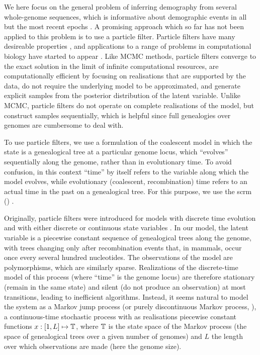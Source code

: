 We here focus on the general problem of inferring demography from several
whole-genome sequences,
which is informative about demographic events in all but the most recent epochs \cite{Schiffels2014b,Li2011a}.
A promising approach which so far has not been applied to this
problem is to use a particle filter.  Particle filters have many
desireable
properties \cite{Arulampalam2002,Doucet2000,Gordon1993},
and applications to a range of problems in computational biology have started to appear
\cite{L2020,M2018,RA2017,Taylor2014}.
Like MCMC methods, particle filters converge to the exact solution in
the limit of infinite computational resources, are computationally efficient by focusing on realisations that are 
supported by the data, do not require the underlying model to be
approximated, and generate explicit samples from the posterior distribution of the latent variable.
Unlike MCMC, particle filters do not operate on complete realisations
of the model, but construct samples sequentially, which is helpful
since full genealogies over genomes are cumbersome to deal with.

To use particle filters, we use a formulation of the coalescent model
in which the state is a genealogical tree at a particular genome
locus, which ``evolves'' sequentially along the genome, rather than in evolutionary
time.  To avoid confusion, in this context ``time'' by itself refers to
the variable along which the model evolves, while evolutionary
(coalescent, recombination) time refers to an actual time in the past
on a genealogical tree. For this purpose, we use the \gls{scrm} () \cite{Staab2015}.

Originally, particle filters were introduced for models with discrete time evolution
and with either discrete or continuous state variables
\cite{Rosenbluth2004,Gordon1993}.
In our model, the latent variable is a piecewise constant sequence of
genealogical trees along the genome, with trees changing only after
recombination events that, in mammals, occur once every several hundred nucleotides.
The observations of the model are polymorphisms, which are similarly sparse.
Realizations of the discrete-time model of this process (where ``time'' is
the genome locus) are therefore stationary (remain in the same state)
and silent (do not produce an observation) at most
transitions, leading to inefficient algorithms.
Instead, it seems natural to model the system as a
Markov jump process (or purely discontinuous Markov process, \cite{Feller1940}),
a continuous-time stochastic process with as realisations piecewise constant functions $x:[1,L]\mapsto\mathbb{T}$, where $\mathbb{T}$ is the state space of the Markov process (the
space of genealogical trees over a given number of genomes) and
$L$ the length over which observations are made (here the genome size).

